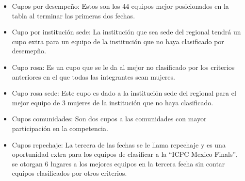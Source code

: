 \begin{itemize}
    \item Cupos por desempeño: Estos son los 44 equipos mejor posicionados en la tabla al terminar las primeras dos fechas.
    \item Cupo por institución sede: La institución que sea sede del regional tendrá un cupo extra para un equipo de la institución que no haya clasificado por desemepño.
    \item Cupo rosa: Es un cupo que se le da al mejor no clasificado por los criterios anteriores en el que todas las integrantes sean mujeres.
    \item Cupo rosa sede: Este cupo es dado a la institución sede del regional para el mejor equipo de 3 mujeres de la institución que no haya clasificado.
    \item Cupos comunidades: Son dos cupos a las comunidades con mayor participación en la competencia.
    \item Cupos repechaje: La tercera de las fechas se le llama repechaje y es una oportunidad extra para los equipos de clasificar a la ``ICPC Mexico Finals'', se otorgan 6 lugares a los mejores equipos en la tercera fecha sin contar equipos clasificados por otros criterios.
\end{itemize}